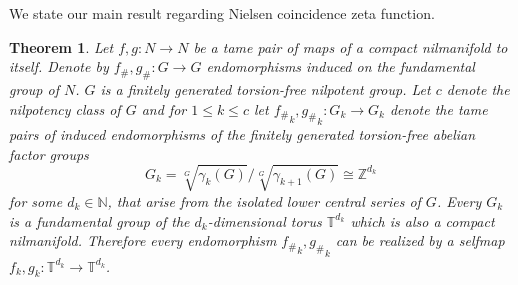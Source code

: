 \documentclass[12pt, a4paper]{amsart}
\def\Z{{\mathbb Z}}
\def\T{{\mathbb T}}
\newtheorem{theorem}{Theorem}
\def\N{{\mathbb N}}
\begin{document}
We state our main result regarding Nielsen coincidence zeta function.
\begin{theorem}\label{thm:main-result-nielsen-coincidence}
  Let $f,g:N \to N$ be a tame pair of maps of a compact nilmanifold to itself.
  Denote by $f_\#, g_\#:G \to G$ endomorphisms induced on the fundamental group of $N$.
  $G$ is a finitely generated torsion-free nilpotent group.
  Let $c$ denote the nilpotency class of $G$ and for $1 \leq k \leq c$ let
  ${f_\#}_k, {g_\#}_k: G_k \to G_k$ denote the tame pairs of induced endomorphisms
  of the finitely generated torsion-free abelian factor groups
  \[
    G_k = \sqrt[G]{\gamma_k(G)} / \sqrt[G]{\gamma_{k+1}(G)} \cong \Z^{d_k}
  \]
  for some $d_k \in \N$, that arise from the isolated lower central series of $G$.
  Every $G_k$ is a fundamental group of the $d_k$-dimensional torus $\T^{d_k}$ which is also a compact nilmanifold.
  Therefore every endomorphism ${f_\#}_k, {g_\#}_k$ can be realized by a selfmap
  $f_k, g_k: \T^{d_k} \to \T^{d_k}$.


\end{theorem}
\end{document}
